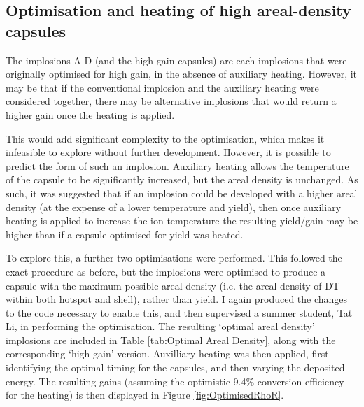 \subsection{Optimisation and heating of high areal-density capsules}
The implosions A-D (and the high gain capsules) are each implosions that were originally optimised for high gain, in the absence of auxiliary heating. However, it may be that if the conventional implosion and the auxiliary heating were considered together, there may be alternative implosions that would return a higher gain once the heating is applied.

This would add significant complexity to the optimisation, which makes it infeasible to explore without further development. However, it is possible to predict the form of such an implosion. Auxiliary heating allows the temperature of the capsule to be significantly increased, but the areal density is unchanged. As such, it was suggested that if an implosion could be developed with a higher areal density (at the expense of a lower temperature and yield), then once auxiliary heating is applied to increase the ion temperature the resulting yield/gain may be higher than if a capsule optimised for yield was heated.

To explore this, a further two optimisations were performed. This followed the exact procedure as before, but the implosions were optimised to produce a capsule with the maximum possible areal density (i.e. the areal density of DT within both hotspot and shell), rather than yield. I again produced the changes to the code necessary to enable this, and then supervised a summer student, Tat Li, in performing the optimisation. The resulting `optimal areal density' implosions are included in Table \ref{tab:Optimal Areal Density}, along with the corresponding `high gain' version. Auxilliary heating was then applied, first identifying the optimal timing for the capsules, and then varying the deposited energy. The resulting gains (assuming the optimistic 9.4\% conversion efficiency for the heating) is then displayed in Figure \ref{fig:OptimisedRhoR}.


